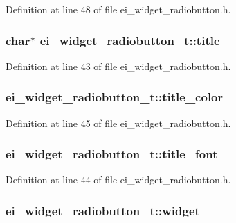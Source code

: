 Definition at line 48 of file ei\-\_\-widget\-\_\-radiobutton.\-h.

\hypertarget{structei__widget__radiobutton__t_a5fefe99675a2884417a20383885ea5a6}{
\subsubsection[{title}]{\setlength{\rightskip}{0pt plus 5cm}char$\ast$ ei\-\_\-widget\-\_\-radiobutton\-\_\-t\-::title}}\label{structei__widget__radiobutton__t_a5fefe99675a2884417a20383885ea5a6}


Definition at line 43 of file ei\-\_\-widget\-\_\-radiobutton.\-h.

\hypertarget{structei__widget__radiobutton__t_ae10f422aa713c064b39094476f804cc6}{
\subsubsection[{title\-\_\-color}]{ ei\-\_\-widget\-\_\-radiobutton\-\_\-t\-::title\-\_\-color}}\label{structei__widget__radiobutton__t_ae10f422aa713c064b39094476f804cc6}


Definition at line 45 of file ei\-\_\-widget\-\_\-radiobutton.\-h.

\hypertarget{structei__widget__radiobutton__t_a2494261ae892b7666846498bbe0ad461}{
\subsubsection[{title\-\_\-font}]{ ei\-\_\-widget\-\_\-radiobutton\-\_\-t\-::title\-\_\-font}}\label{structei__widget__radiobutton__t_a2494261ae892b7666846498bbe0ad461}


Definition at line 44 of file ei\-\_\-widget\-\_\-radiobutton.\-h.

\hypertarget{structei__widget__radiobutton__t_a0a43ac1f993d211be2c618c2f0ee101a}{
\subsubsection[{widget}]{ ei\-\_\-widget\-\_\-radiobutton\-\_\-t\-::widget}}\label{structei__widget__radiobutton__t_a0a43ac1f993d211be2c618c2f0ee101a}


